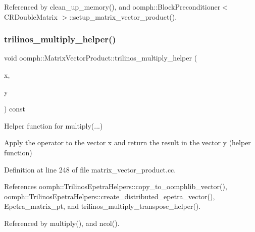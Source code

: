Referenced by clean\+\_\+up\+\_\+memory(), and oomph\+::\+Block\+Preconditioner$<$ C\+R\+Double\+Matrix $>$\+::setup\+\_\+matrix\+\_\+vector\+\_\+product().

\mbox{\label{classoomph_1_1MatrixVectorProduct_a431b4a1aec80593b729aef89d26dd408}} 
\subsubsection{\texorpdfstring{trilinos\+\_\+multiply\+\_\+helper()}{trilinos\_multiply\_helper()}}
{\footnotesize\ttfamily void oomph\+::\+Matrix\+Vector\+Product\+::trilinos\+\_\+multiply\+\_\+helper (\begin{DoxyParamCaption}\item[{const \hyperlink{classoomph_1_1DoubleVector}{Double\+Vector} \&}]{x,  }\item[{\hyperlink{classoomph_1_1DoubleVector}{Double\+Vector} \&}]{y }\end{DoxyParamCaption}) const\hspace{0.3cm}{\ttfamily [private]}}



Helper function for multiply(...) 

Apply the operator to the vector x and return the result in the vector y (helper function) 

Definition at line 248 of file matrix\+\_\+vector\+\_\+product.\+cc.



References oomph\+::\+Trilinos\+Epetra\+Helpers\+::copy\+\_\+to\+\_\+oomphlib\+\_\+vector(), oomph\+::\+Trilinos\+Epetra\+Helpers\+::create\+\_\+distributed\+\_\+epetra\+\_\+vector(), Epetra\+\_\+matrix\+\_\+pt, and trilinos\+\_\+multiply\+\_\+transpose\+\_\+helper().



Referenced by multiply(), and ncol().

\mbox{\label{classoomph_1_1MatrixVectorProduct_a192d6aba55af4354c22bc44ab9c9b064}} 
